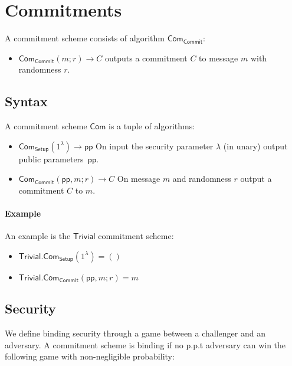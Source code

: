 \section{Commitments}\label{sec:commitments}


A commitment scheme consists of algorithm $\mathsf{Com}_\mathsf{Commit}$:
\begin{itemize}
    \item $\mathsf{Com}_\mathsf{Commit}(m;r)\rightarrow C$ outputs a commitment $C$ to message $m$ with randomness $r$.
\end{itemize}

\subsection{Syntax}
A commitment scheme $\mathsf{Com}$ is a tuple of algorithms:

\begin{itemize}
  \item $\mathsf{Com}_\mathsf{Setup}(1^\lambda) \rightarrow \mathsf{pp}$
        On input the security parameter $\lambda$ (in unary) output public
        parameters~$\mathsf{pp}$.

  \item $\mathsf{Com}_\mathsf{Commit}(\mathsf{pp},m;r)\rightarrow C$
        On message $m$ and randomness $r$ output a commitment $C$ to $m$.
\end{itemize}


\paragraph{Example} An example is the $\mathsf{Trivial}$ commitment scheme:
\begin{itemize}
  \item $\mathsf{Trivial}.\mathsf{Com}_\mathsf{Setup}(1^\lambda) = ()$
  \item $\mathsf{Trivial}.\mathsf{Com}_\mathsf{Commit}(\mathsf{pp},m;r) = m$
\end{itemize}

\subsection{Security}
We define binding security through a game between a challenger and an adversary.
A commitment scheme is binding if no p.p.t adversary can win the following game with non-negligible probability:

